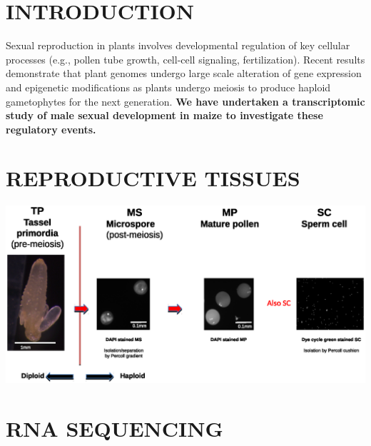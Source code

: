 \documentclass[a0,30pt]{sciposter}
\newlength{\figwidth}
\begin{document}
\begin{multicols}{3}
  

  \section*{INTRODUCTION}

  Sexual reproduction in plants involves developmental regulation of key cellular processes (e.g., pollen tube growth, cell-cell signaling, fertilization). Recent results demonstrate 
  that plant genomes undergo large scale alteration of gene expression and epigenetic modifications as plants undergo meiosis to produce haploid gametophytes for the next generation.
  \textbf{We have undertaken a transcriptomic study of male sexual development in maize to investigate these regulatory events.}
  
  \section*{REPRODUCTIVE TISSUES}
  
  \begin{center}
    \includegraphics[width=\figwidth]{Samples-Libraries.eps}
  \end{center}

  \section*{RNA SEQUENCING}


\end{multicols}
\end{document}
